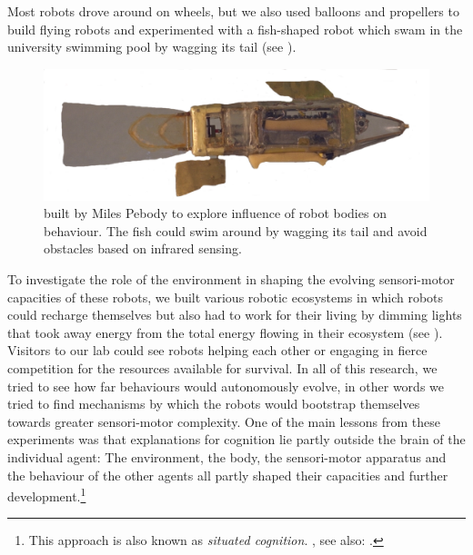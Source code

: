 Most robots drove around on wheels, but we also used balloons and propellers to build 
flying robots and experimented with a fish-shaped robot which swam in the university swimming pool by wagging 
its tail (see ). 


\begin{figure}[htbp]
  \centerline{\includegraphics[width=.85\textwidth]{chap1/figs/fish.pdf}}
\caption{ built by Miles Pebody to explore influence of robot bodies on behaviour. The fish could swim around by wagging 
its tail and avoid obstacles based on infrared sensing.}
\label{f:plate4}
\end{figure}

To investigate the role of the environment in shaping the
evolving sensori-motor capacities of these robots, 
we built various robotic 
ecosystems in which robots could recharge themselves but also
had to work for their living by 
dimming lights that took away energy from the total energy 
flowing in their ecosystem (see ). Visitors
to our lab could see robots helping each other or 
engaging in fierce competition for
the resources available for survival. In all of this
research, we tried to see how far behaviours would
autonomously evolve, in other words we tried to find 
mechanisms by which the robots would bootstrap themselves 
towards greater sensori-motor complexity. One of the 
main lessons from these experiments was that 
explanations for cognition lie partly outside the brain 
of the individual agent: The environment, the body, the 
sensori-motor apparatus and the behaviour of the other 
agents all partly shaped their capacities and 
further development.\footnote{This approach is also known as {\itshape situated cognition}. 
\cite{Clancey:1997}, see also: \cite{Varela:1991}.}


